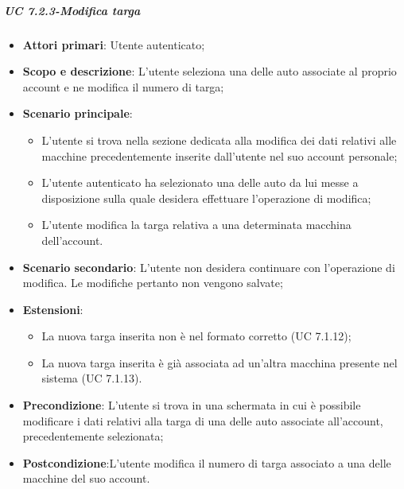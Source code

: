     \subparagraph{UC 7.2.3-Modifica targa}
            \begin{itemize}
                \item \textbf{Attori primari}: Utente autenticato;
                
                \item \textbf{Scopo e descrizione}: L'utente seleziona una delle auto associate al proprio account e ne modifica il numero di targa; 
                \item \textbf{Scenario principale}:
                    \begin{itemize}
                        \item L'utente si trova nella sezione dedicata alla modifica dei dati relativi alle macchine precedentemente inserite dall'utente nel suo account personale;
                        \item L'utente autenticato ha selezionato una delle auto da lui messe a disposizione sulla quale desidera effettuare l'operazione di modifica;
                        \item L'utente modifica la targa relativa a una determinata macchina dell'account.
                    \end{itemize}
                \item \textbf{Scenario secondario}: L'utente non desidera continuare con l'operazione di modifica. Le modifiche pertanto non vengono salvate;
                \item \textbf{Estensioni}:
                    \begin{itemize}
                        \item La nuova targa inserita non è nel formato corretto (UC 7.1.12);
                        \item La nuova targa inserita è già associata ad un'altra macchina presente nel sistema (UC 7.1.13).
                    \end{itemize}
                \item \textbf{Precondizione}: L'utente si trova in una schermata in cui è possibile modificare i dati relativi alla targa di una delle auto associate all'account, precedentemente selezionata;
                \item \textbf{Postcondizione}:L'utente modifica il numero di targa associato a una delle macchine del suo account.
            \end{itemize}
    

